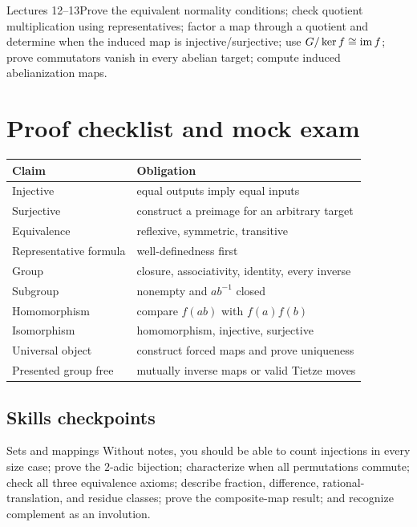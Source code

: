 \documentclass[11pt,openany]{book}
\theoremstyle{definition}
\begin{document}
\begin{checkpoint}{Lectures 12--13}Prove the equivalent normality conditions; check quotient multiplication using representatives; factor a map through a quotient and determine when the induced map is injective/surjective; use $G/\ker f\cong\operatorname{im} f$; prove commutators vanish in every abelian target; compute induced abelianization maps.\end{checkpoint}


\chapter{Proof checklist and mock exam}
\begin{center}\begin{tabular}{@{}p{}p{}@{}}\toprule
Claim&Obligation\\\midrule
Injective&equal outputs imply equal inputs\\Surjective&construct a preimage for an arbitrary target\\Equivalence&reflexive, symmetric, transitive\\Representative formula&well-definedness first\\Group&closure, associativity, identity, every inverse\\Subgroup&nonempty and $ab^{-1}$ closed\\Homomorphism&compare $f(ab)$ with $f(a)f(b)$\\Isomorphism&homomorphism, injective, surjective\\Universal object&construct forced maps and prove uniqueness\\Presented group free&mutually inverse maps or valid Tietze moves\\\bottomrule\end{tabular}\end{center}

\section{Skills checkpoints}
\begin{checkpoint}{Sets and mappings}
Without notes, you should be able to count injections in every size case; prove the $2$-adic bijection; characterize when all permutations commute; check all three equivalence axioms; describe fraction, difference, rational-translation, and residue classes; prove the composite-map result; and recognize complement as an involution.
\end{checkpoint}
\end{document}
